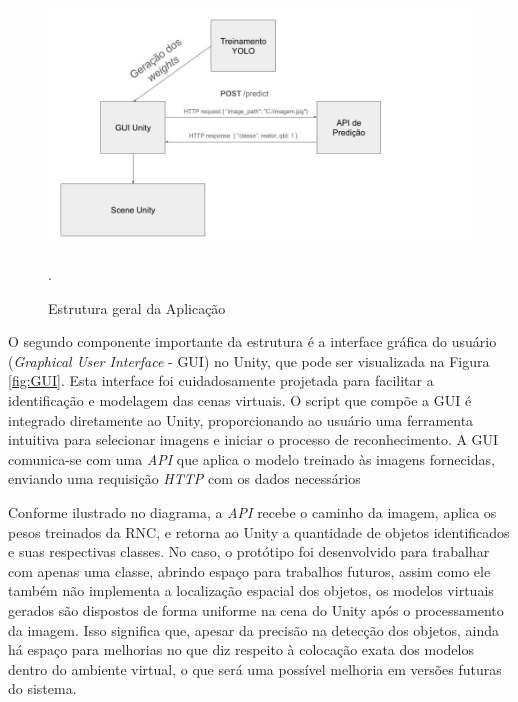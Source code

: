 \begin{figure}[!h]
    \centering
    \begin{minipage}{1\linewidth}
    \centering
    \captionsetup{justification=centering,margin=0.5cm,font=small}
    \includegraphics[width=1\linewidth]{img/cap5/estrutura.jpg}
    \caption{Estrutura geral da Aplicação}.
    \label{fig:estrutura}
    \end{minipage}
\end{figure}

O segundo componente importante da estrutura é a interface gráfica do usuário (\textit{Graphical User Interface} - GUI) no Unity, que pode ser visualizada na Figura \ref{fig:GUI}. Esta interface foi cuidadosamente projetada para facilitar a identificação e modelagem das cenas virtuais. O script que compõe a GUI é integrado diretamente ao Unity, proporcionando ao usuário uma ferramenta intuitiva para selecionar imagens e iniciar o processo de reconhecimento. A GUI comunica-se com uma \textit{API} que aplica o modelo treinado às imagens fornecidas, enviando uma requisição \textit{HTTP} com os dados necessários

Conforme ilustrado no diagrama, a \textit{API} recebe o caminho da imagem, aplica os pesos treinados da RNC, e retorna ao Unity a quantidade de objetos identificados e suas respectivas classes. No caso, o protótipo foi desenvolvido para trabalhar com apenas uma classe, abrindo espaço para trabalhos futuros, assim como ele também não implementa a localização espacial dos objetos, os modelos virtuais gerados são dispostos de forma uniforme na cena do Unity após o processamento da imagem. Isso significa que, apesar da precisão na detecção dos objetos, ainda há espaço para melhorias no que diz respeito à colocação exata dos modelos dentro do ambiente virtual, o que será uma possível melhoria em versões futuras do sistema.

